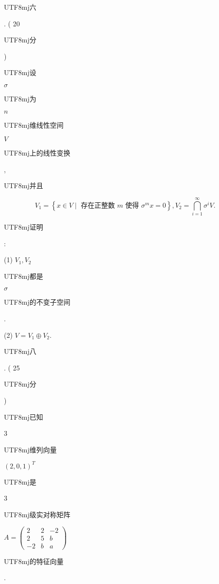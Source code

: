 \documentclass[10pt]{article}
\begin{document}
\begin{CJK}{UTF8}{mj}六\end{CJK}. ( 20 \begin{CJK}{UTF8}{mj}分\end{CJK}) \begin{CJK}{UTF8}{mj}设\end{CJK} $\sigma$ \begin{CJK}{UTF8}{mj}为\end{CJK} $n$ \begin{CJK}{UTF8}{mj}维线性空间\end{CJK} $V$ \begin{CJK}{UTF8}{mj}上的线性变换\end{CJK}, \begin{CJK}{UTF8}{mj}并且\end{CJK}
$$
V_{1}=\left\{x \in V \mid \text { 存在正整数 } m \text { 使得 } \sigma^{m} x=0\right\}, V_{2}=\bigcap_{i=1}^{\infty} \sigma^{i} V \text {. }
$$
\begin{CJK}{UTF8}{mj}证明\end{CJK}:

(1) $V_{1}, V_{2}$ \begin{CJK}{UTF8}{mj}都是\end{CJK} $\sigma$ \begin{CJK}{UTF8}{mj}的不变子空间\end{CJK}.

(2) $V=V_{1} \oplus V_{2}$. \begin{CJK}{UTF8}{mj}八\end{CJK}. ( 25 \begin{CJK}{UTF8}{mj}分\end{CJK}) \begin{CJK}{UTF8}{mj}已知\end{CJK} 3 \begin{CJK}{UTF8}{mj}维列向量\end{CJK} $(2,0,1)^{T}$ \begin{CJK}{UTF8}{mj}是\end{CJK} 3 \begin{CJK}{UTF8}{mj}级实对称矩阵\end{CJK} $A=\left(\begin{array}{ccc}2 & 2 & -2 \\ 2 & 5 & b \\ -2 & b & a\end{array}\right)$ \begin{CJK}{UTF8}{mj}的特征向量\end{CJK}.
\end{document}
